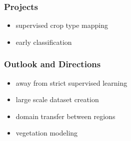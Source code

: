 \documentclass[%
  aspectratio=169,
  9pt,
  USenglish,
  titlegraphic, %
  affiliationintitlepagehead,
  progressbar,
]{beamer}
\begin{document}








\begin{frame}
\frametitle{Projects}


\begin{itemize}
	\item supervised crop type mapping
	\item early classification
\end{itemize}

\end{frame}

\begin{frame}
	\frametitle{Outlook and Directions}
	\begin{itemize}
		\item away from strict supervised learning
		\item large scale dataset creation
		\item domain transfer between regions
		\item vegetation modeling
	\end{itemize}
\end{frame}
\end{document}
